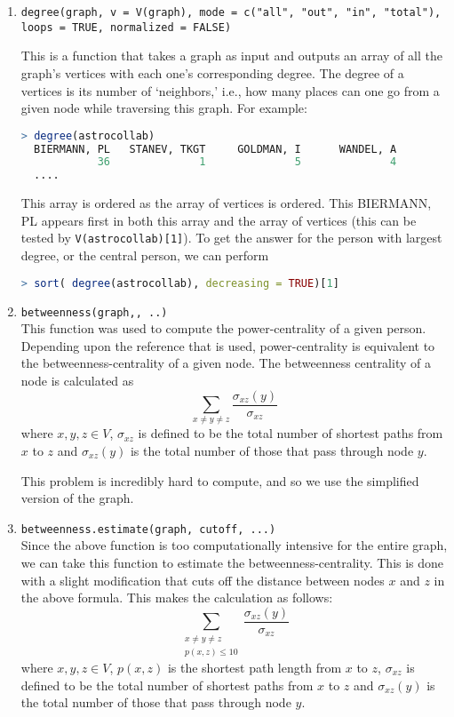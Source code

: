 \documentclass{article}
\begin{document}
\begin{enumerate}

	\item \texttt{degree(graph, v = V(graph), mode = c("all", "out", "in", "total"),
  				      loops = TRUE, normalized = FALSE)}
	
		This is a function that takes a graph as input and outputs an array of all the graph's vertices with each one's corresponding degree. The degree of a vertices is its number of `neighbors,' i.e., how many places can one go from a given node while traversing this graph. For example:
\begin{lstlisting}[language=R]
> degree(astrocollab)
  BIERMANN, PL   STANEV, TKGT     GOLDMAN, I      WANDEL, A 
            36              1              5              4 
  ....
		\end{lstlisting}
		This array is ordered as the array of vertices is ordered. This BIERMANN, PL appears first in both this array and the array of vertices (this can be tested by \texttt{V(astrocollab)[1]}). To get the answer for the person with largest degree, or the central person, we can perform 
\begin{lstlisting}[language=R]
> sort( degree(astrocollab), decreasing = TRUE)[1]
		\end{lstlisting}


	\item \texttt{betweenness(graph,, ..)}\\
	This function was used to compute the power-centrality of a given person. Depending upon the reference that is used, power-centrality is equivalent to the betweenness-centrality of a given node. The betweenness centrality of a node is calculated as 
	$$ \sum_{x \neq y \neq z} \frac{\sigma_{xz}(y)}{\sigma_{xz}} $$
	where $x,y,z\in V$, $\sigma_{xz}$ is defined to be the total number of shortest paths from $x$ to $z$ and $\sigma_{xz}(y)$ is the total number of those that pass through node $y$. 
	
	This problem is incredibly hard to compute, and so we use the simplified version of the graph.
	 
	\item \texttt{betweenness.estimate(graph, cutoff, ...)}\\
	Since the above function is too computationally intensive for the entire graph, we can take this function to estimate the betweenness-centrality. This is done with a slight modification that cuts off the distance between nodes $x$ and $z$ in the above formula. This makes the calculation as follows:
		$$ \sum_{\substack{x \neq y \neq z \\ p(x,z) \leq 10}} \frac{\sigma_{xz}(y)}{\sigma_{xz}} $$
	where $x,y,z\in V$, $p(x,z)$ is the shortest path length from $x$ to $z$, $\sigma_{xz}$ is defined to be the total number of shortest paths from $x$ to $z$ and $\sigma_{xz}(y)$ is the total number of those that pass through node $y$. 


\end{enumerate}
\end{document}
